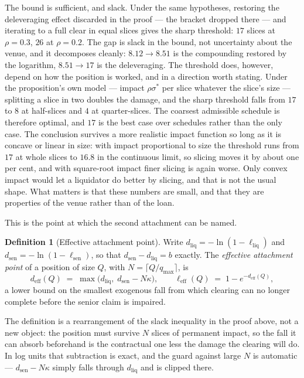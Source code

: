 \documentclass[11pt,a4paper]{article}
\theoremstyle{plain}
\theoremstyle{definition}
\newtheorem{definition}[proposition]{Definition}
\theoremstyle{remark}
\begin{document}
The bound is sufficient, and slack. Under the same hypotheses, restoring the deleveraging effect
discarded in the proof --- the bracket dropped there --- and iterating to a full clear in equal
slices gives the sharp threshold: $17$ slices at $\rho=0.3$, $26$ at $\rho=0.2$. The gap is slack
in the bound, not uncertainty about the venue, and it decomposes cleanly: $8.12\to8.51$ is the
compounding restored by the logarithm, $8.51\to17$ is the deleveraging. The threshold does,
however, depend on how the position is worked, and in a direction worth stating. Under the proposition's own model --- impact
$\rho\sigma^{*}$ per slice whatever the slice's size --- splitting a slice in two doubles the
damage, and the sharp threshold falls from $17$ to $8$ at half-slices and $4$ at quarter-slices.
The coarsest admissible schedule is therefore optimal, and $17$ is the best case over schedules
rather than the only case. The conclusion survives a more realistic impact function so long as it
is concave or linear in size: with impact proportional to size the threshold runs from $17$ at
whole slices to $16.8$ in the continuous limit, so slicing moves it by about one per cent, and
with square-root impact finer slicing is again worse.
Only convex impact would let a liquidator do better by slicing, and that is not the usual shape.
What matters is that these numbers are small, and that they are properties of the venue rather
than of the loan.

This is the point at which the second attachment can be named.

\begin{definition}[Effective attachment point]\label{def:eff}
Write $d_{\mathrm{liq}}=-\ln(1-\ell_{\mathrm{liq}})$ and $d_{\mathrm{sen}}=-\ln(1-\ell_{\mathrm{sen}})$,
so that $d_{\mathrm{sen}}-d_{\mathrm{liq}}=b$ exactly. The \emph{effective attachment point} of a
position of size $Q$, with $N=\lceil Q/q_{\max}\rceil$, is
\[
  d_{\mathrm{eff}}(Q) \;=\; \max\bigl(d_{\mathrm{liq}},\; d_{\mathrm{sen}}-N\kappa\bigr),
  \qquad
  \ell_{\mathrm{eff}}(Q) \;=\; 1-e^{-d_{\mathrm{eff}}(Q)} ,
\]
a lower bound on the smallest exogenous fall from which clearing can no longer complete before the
senior claim is impaired.
\end{definition}

The definition is a rearrangement of the slack inequality in the proof above, not a new object:
the position must survive $N$ slices of permanent impact, so the fall it can absorb beforehand is
the contractual one less the damage the clearing will do. In log units that subtraction is exact,
and the guard against large $N$ is automatic --- $d_{\mathrm{sen}}-N\kappa$ simply falls through
$d_{\mathrm{liq}}$ and is clipped there.
\end{document}
